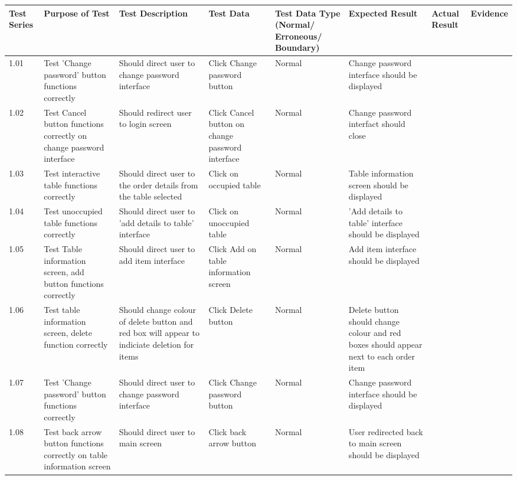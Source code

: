 \begin{landscape}
\begin{center}
    \begin{longtable}{|p{1.5cm}|p{2.5cm}|p{2.5cm}|p{2cm}|p{2cm}|p{2cm}|p{2cm}|p{2cm}|}
        \hline
        \textbf{Test Series} & \textbf{Purpose of Test} & \textbf{Test Description} & \textbf{Test Data} & \textbf{Test Data Type (Normal/ Erroneous/ Boundary)} & \textbf{Expected Result} & \textbf{Actual Result} & \textbf{Evidence}\\ \hline
        1.01 & Test 'Change password' button functions correctly & Should direct user to change password interface  & Click Change password button & Normal & Change password interface should be displayed &  &  \\ \hline
        1.02 & Test Cancel button functions correctly on change password interface & Should redirect user to login screen  & Click Cancel button on change password interface & Normal & Change password interfact should close &  &  \\ \hline
        1.03 & Test interactive table functions correctly & Should direct user to the order details from the table selected  & Click on occupied table & Normal & Table  information screen should be displayed &  &  \\ \hline
        1.04 & Test unoccupied table functions correctly & Should direct user to 'add details to table'  interface  & Click on unoccupied table & Normal & 'Add details to table' interface should be displayed &  &  \\ \hline
        1.05 & Test Table information screen, add button functions correctly & Should direct user to add item  interface  & Click Add on table information screen & Normal & Add item interface should be displayed &  &  \\ \hline
        1.06 & Test table information screen, delete function correctly & Should change colour of delete button and red box will appear to indiciate deletion for items  & Click Delete button & Normal & Delete button should change colour and red boxes should appear next to each order item &  &  \\ \hline
        1.07 & Test 'Change password' button functions correctly & Should direct user to change password interface  & Click Change password button & Normal & Change password interface should be displayed &  &  \\ \hline
        1.08 & Test back arrow button functions correctly on table information screen & Should direct user to main screen & Click back arrow button & Normal & User redirected back to main screen should be displayed &  &  \\ \hline

\end{longtable}
\end{center}
\end{landscape}
